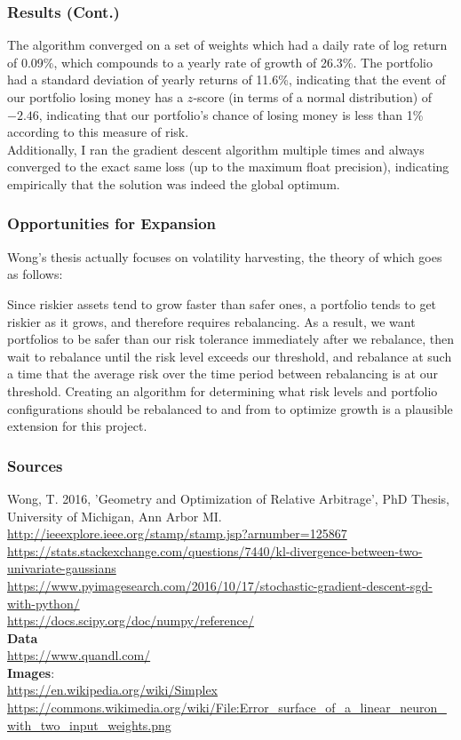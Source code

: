 \documentclass{beamer}
\begin{document}
\begin{frame}
\frametitle{Results (Cont.)}
The algorithm converged on a set of weights which had a daily rate of log return of 0.09\%, which compounds to a yearly rate of growth of 26.3\%.
The portfolio had a standard deviation of yearly returns of 11.6\%, indicating that the event of our portfolio losing money has a $z$-score (in terms of a normal distribution) of $-2.46$, indicating that our portfolio's chance of losing money is less than 1\% according to this measure of risk.
\vspace{.1in}
\\Additionally, I ran the gradient descent algorithm multiple times and always converged to the exact same loss (up to the maximum float precision), indicating empirically that the solution was indeed the global optimum.
\end{frame}

\begin{frame}
\frametitle{Opportunities for Expansion}
Wong's thesis actually focuses on volatility harvesting, the theory of which goes as follows:

Since riskier assets tend to grow faster than safer ones, a portfolio tends to get riskier as it grows, and therefore requires rebalancing.  As a result, we want portfolios to be safer than our risk tolerance immediately after we rebalance, then wait to rebalance until the risk level exceeds our threshold, and rebalance at such a time that the average risk over the time period between rebalancing is at our threshold.  Creating an algorithm for determining what risk levels and portfolio configurations should be rebalanced to and from to optimize growth is a plausible extension for this project.
\end{frame}

\begin{frame}
\frametitle{Sources}
Wong, T. 2016, 'Geometry and Optimization of Relative Arbitrage', PhD Thesis, University of Michigan, Ann Arbor MI.
\url{http://ieeexplore.ieee.org/stamp/stamp.jsp?arnumber=125867}
\\\url{https://stats.stackexchange.com/questions/7440/kl-divergence-between-two-univariate-gaussians}
\\\url{https://www.pyimagesearch.com/2016/10/17/stochastic-gradient-descent-sgd-with-python/}
\\\url{https://docs.scipy.org/doc/numpy/reference/}
\\\textbf{Data}
\\\url{https://www.quandl.com/}
\\\textbf{Images}:
\\\url{https://en.wikipedia.org/wiki/Simplex}
\\\url{https://commons.wikimedia.org/wiki/File:Error_surface_of_a_linear_neuron_with_two_input_weights.png}
\end{frame}
\end{document}
